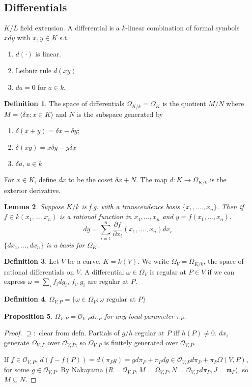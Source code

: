 \documentclass{article}
\theoremstyle{definition}
\newtheorem{defn}{Definition}[section]
\theoremstyle{remark}
\theoremstyle{plain}
\newtheorem{lem}[defn]{Lemma}
\newtheorem{prop}[defn]{Proposition}
\begin{document}
\subsection{Differentials}
$K/L$ field extension.
    A differential is a $k$-linear combination of formal symbols $xdy$ with $x,y\in K$ s.t. 
    \begin{enumerate}[(1)]
        \item $d(\cdot)$ is linear.
        \item Leibniz rule $d(xy)$
        \item $da=0$ for $a\in k$.
    \end{enumerate}
\begin{defn}
    The space of differentials $\Omega_{K/k}=\Omega_K$ is the quotient $M/N$ where $M=\langle\delta x:x\in K\rangle$ and $N$ is the subspace generated by
    \begin{enumerate}[(1)]
        \item $\delta(x+y)=\delta x-\delta y$;
        \item $\delta(xy)=x\delta y-y\delta x$
        \item $\delta a$, $a\in k$
    \end{enumerate}
    For $x\in K$, define $dx$ to be the coset $\delta x+N$. The map $d:K\to\Omega_{K/k}$ is the exterior derivative.
\end{defn}
\begin{lem}
    Suppose $K/k$ is f.g. with a transcendence basis $\{x_1,....,x_n\}$. Then if $f\in k(x_1,...,x_n)$ is a rational function in $x_1,...,x_n$ and $y=f(x_1,...,x_n)$.
    \[dy=\sum_{i=1}^n\frac{\partial f}{\partial x_i}(x_1,....,x_n)dx_i\]
    $\{dx_1,...,dx_n\}$ is a basis for $\Omega_K$.
\end{lem}
\begin{defn}
    Let $V$ be a curve, $K=k(V)$. We write $\Omega_V=\Omega_{K/k}$, the space of rational differentials on $V$. A differential $\omega\in\Omega_V$ is regular at $P\in V$ if we can express $\omega=\sum_i f_idg_i$, $f_i,g_i$ are regular at $P$.
\end{defn}
\begin{defn}
    $\Omega_{V,P}=\{\omega\in\Omega_V:\omega\text{ regular at }P\}$
\end{defn}
\begin{prop}
    $\Omega_{V,P}=\mathcal O_{V,P}d\pi_P$ for any local parameter $\pi_P$.
\end{prop}
\begin{proof}
    $\supseteq:$ clear from defn. Partials of $g/h$ regular at $P$ iff $h(P)\neq0$. $dx_i$ generate $\Omega_{V,P}$ over $\mathcal O_{V,P}$, so $\Omega_{V,P}$ is finitely generated over $\mathcal O_{V,P}$.

    If $f\in\mathcal O_{V,P}$, $d(f-f(P))=d(\pi_P g)=gd\pi_P+\pi_Pdg\in\mathcal O_{V,P}{d\pi_P}+\pi_P\Omega(V,P)$, for some $g\in\mathcal O_{V,P}$. By Nakayama ($R=\mathcal O_{V,P}, M=\Omega_{V,P}, N=\mathcal O_{V,P}d\pi_P, J=\mathfrak m_P$), so $M\subseteq N$.
\end{proof}
\end{document}
